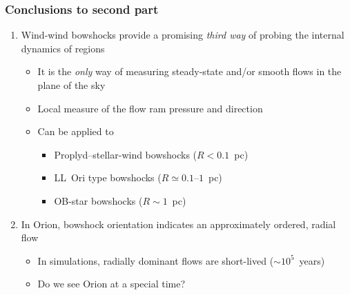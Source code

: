 \documentclass[presentation]{beamer}
\begin{document}
\begin{frame}
  \frametitle{Conclusions to second part}
  \begin{enumerate}
  \item Wind-wind bowshocks provide a promising \emph{third way} of
    probing the internal dynamics of \hii{} regions
    \begin{itemize}
    \item It is the \emph{only} way of measuring steady-state and/or
      smooth flows in the plane of the sky
    \item Local measure of the flow ram pressure and direction
    \item Can be applied to
      \begin{itemize}
      \item Proplyd--stellar-wind bowshocks (\(R < 0.1\)~pc)
      \item LL~Ori type bowshocks (\(R \simeq 0.1\)--\(1\)~pc)
      \item OB-star bowshocks (\(R \sim 1\)~pc) 
      \end{itemize}

    \end{itemize}
  \item In Orion, bowshock orientation indicates an approximately
    ordered, radial flow
    \begin{itemize}
    \item In simulations, radially dominant flows are
      short-lived (\(\sim 10^5\)~years)
    \item Do we see Orion at a special time?
    \end{itemize}

  \end{enumerate}
\end{frame}
\end{document}

